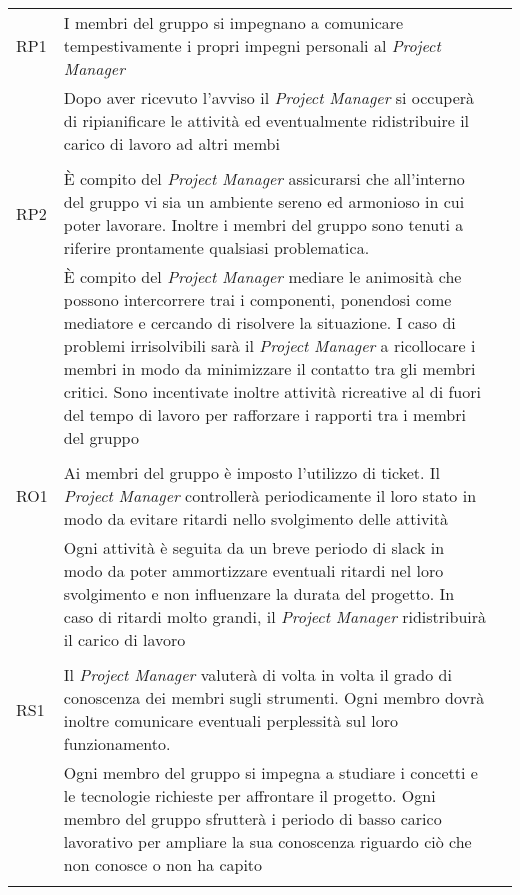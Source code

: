 \begin{table}
\begin{tabular}{l|l|l}
		RP1     & I membri del gruppo si impegnano a comunicare tempestivamente i propri impegni personali al \emph{Project Manager}\\                                                                                                               & Dopo aver ricevuto l'avviso il \emph{Project Manager} si occuperà di ripianificare le attività ed eventualmente ridistribuire il carico di lavoro ad altri membi\\                                                                                                                                                                                                                                                                                                     \\
		RP2     & È compito del \emph{Project Manager} assicurarsi che all'interno del gruppo vi sia un ambiente sereno ed armonioso in cui poter lavorare. Inoltre i membri del gruppo sono tenuti a riferire prontamente qualsiasi problematica.\\ & È compito del \emph{Project Manager} mediare le animosità che possono intercorrere trai i componenti, ponendosi come mediatore e cercando di risolvere la situazione. I caso di problemi irrisolvibili sarà il \emph{Project Manager} a ricollocare i membri in modo da minimizzare il contatto tra gli membri critici. Sono incentivate inoltre attività ricreative al di fuori del tempo di lavoro per rafforzare i rapporti tra i membri del gruppo\\  \\
		RO1     & Ai membri del gruppo è imposto l'utilizzo di ticket. Il \emph{Project Manager} controllerà periodicamente il loro stato in modo da evitare ritardi nello svolgimento delle attività\\                                              & Ogni attività è seguita da un breve periodo di slack in modo da poter ammortizzare eventuali ritardi nel loro svolgimento e non influenzare la durata del progetto. In caso di ritardi molto grandi, il \emph{Project Manager} ridistribuirà il carico di lavoro\\                                                                                                                                                                                                     \\
		RS1     & Il \emph{Project Manager} valuterà di volta in volta il grado di conoscenza dei membri sugli strumenti. Ogni membro dovrà inoltre comunicare eventuali perplessità sul loro funzionamento.\\                                        & Ogni membro del gruppo si impegna a studiare i concetti e le tecnologie richieste per affrontare il progetto. Ogni membro del gruppo sfrutterà i periodo di basso carico lavorativo per ampliare la sua conoscenza riguardo ciò che non conosce o non ha capito\\                                                                                                                                                                                                                    \\

\end{tabular}
\end{table}
